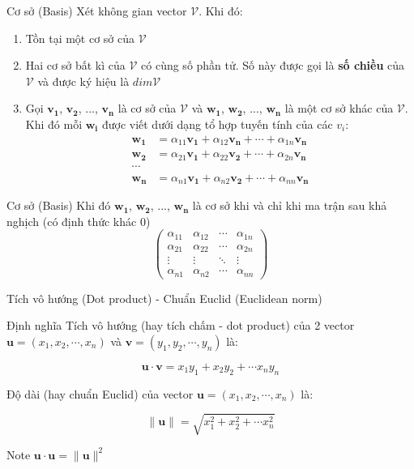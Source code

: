 \begin{frame}{Cơ sở (Basis)}
    Xét không gian vector $\mathcal{V}$. Khi đó:
    \begin{enumerate}
        \item Tồn tại một cơ sở của $\mathcal{V}$
        \item Hai cơ sở bất kì của $\mathcal{V}$ có cùng số phần tử. Số này được gọi là \textbf{số chiều} của $\mathcal{V}$ và được ký hiệu là $dim \mathcal{V}$
        \item Gọi $\bm{v_1}$, $\bm{v_2}$, ..., $\bm{v_n}$ là cơ sở của $\mathcal{V}$ và $\bm{w_1}$, $\bm{w_2}$, ..., $\bm{w_n}$ là một cơ sở khác của $\mathcal{V}$. Khi đó mỗi $\bm{w_i}$ được viết dưới dạng tổ hợp tuyến tính của các $v_i$:
        \begin{align*}
            \bm{w_1} & = \alpha_{11} \bm{v_1} + \alpha_{12} \bm{v_n} + \cdots + \alpha_{1n} \bm{v_n} \\ \bm{w_2} & = \alpha_{21} \bm{v_1} + \alpha_{22} \bm{v_2} + \cdots + \alpha_{2n} \bm{v_n} \\ \cdots \\ \bm{w_n} & = \alpha_{n1} \bm{v_1} + \alpha_{n2} \bm{v_2} + \cdots + \alpha_{nn} \bm{v_n}
        \end{align*}
    \end{enumerate}
\end{frame}

\begin{frame}{Cơ sở (Basis)}
    Khi đó $\bm{w_1}$, $\bm{w_2}$, ..., $\bm{w_n}$ là cơ sở khi và chỉ khi ma trận sau khả nghịch (có định thức khác 0)
    \[\begin{pmatrix}
    \alpha_{11} & \alpha_{12} & \cdots & \alpha_{1n} \\ \alpha_{21} & \alpha_{22} & \cdots & \alpha_{2n} \\
    \vdots & \vdots & \ddots & \vdots \\ \alpha_{n1} & \alpha_{n2} & \cdots & \alpha_{nn}
    \end{pmatrix}\]
\end{frame}

\begin{frame}{Tích vô hướng (Dot product) - Chuẩn Euclid (Euclidean norm)}
    \begin{block}{Định nghĩa}
        Tích vô hướng (hay tích chấm - dot product) của 2 vector $\bm{u}=(x_1, x_2, \cdots, x_n)$ và $\bm{v}=(y_1, y_2, \cdots, y_n)$ là:
        
        \[\bm{u} \cdot \bm{v} = x_1 y_1 + x_2 y_2 + \cdots x_n y_n\]
    
        Độ dài (hay chuẩn Euclid) của vector $\bm{u}=(x_1, x_2, \cdots, x_n)$ là:
    
        \[\| \bm{u} \| = \sqrt{x_1^2 + x_2^2 + \cdots x_n^2}\]
    \end{block}
    
    \begin{alertblock}{Note}
        $\bm{u} \cdot \bm{u} = \|\bm{u}\|^2$
    \end{alertblock}
\end{frame}


